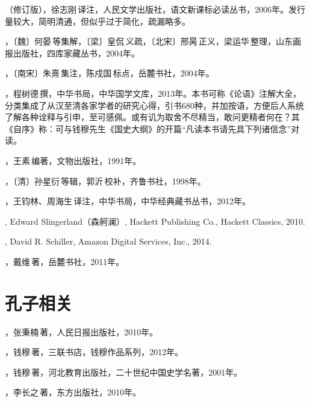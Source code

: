 （修订版），徐志刚\,译注，人民文学出版社，语文新课标必读丛书，2006年。发行量较大，简明清通，但似乎过于简化，疏漏略多。

，〔魏〕何晏\,等集解，〔梁〕皇侃\,义疏，〔北宋〕邢昺\,正义，梁运华\,整理，山东画报出版社，四库家藏丛书，2004年。

，〔南宋〕朱熹\,集注，陈戍国\,标点，岳麓书社，2004年。

，程树德\,撰，中华书局，中华国学文库，2013年。本书可称《论语》注解大全，分类集成了从汉至清各家学者的研究心得，引书680种，并加按语，方便后人系统了解各种诠释与引申，至可感佩。或有讥为取舍不尽精当，敢问更精者何在？其《自序》称：可与钱穆先生《国史大纲》的开篇“凡读本书请先具下列诸信念”对读。

，王素\,编著，文物出版社，1991年。

，〔清〕孙星衍\,等辑，郭沂\,校补，齐鲁书社，1998年。

，王钧林、周海生\,译注，中华书局，中华经典藏书丛书，2012年。

, Edward Slingerland（森舸澜）, Hackett Publishing Co., Hackett Classics, 2010.

, David R. Schiller, Amazon Digital Services, Inc., 2014.

，戴维\,著，岳麓书社，2011年。


\lypdfbookmark\section*{孔子相关}

，张秉楠\,著，人民日报出版社，2010年。

，钱穆\,著，三联书店，钱穆作品系列，2012年。

，钱穆\,著，河北教育出版社，二十世纪中国史学名著，2001年。

，李长之\,著，东方出版社，2010年。

